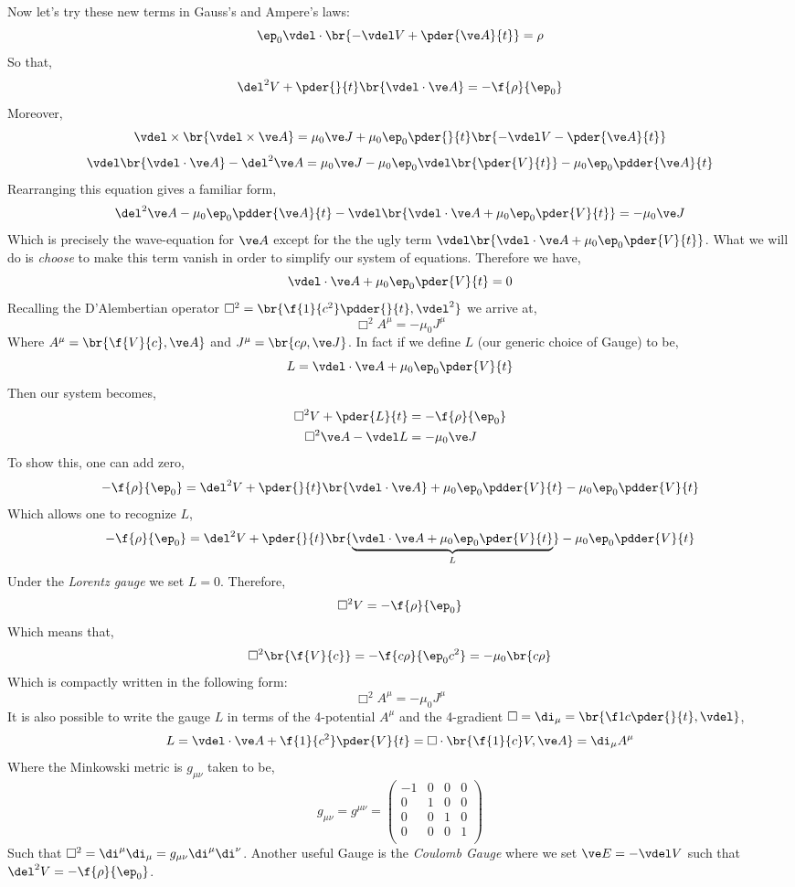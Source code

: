 \documentclass{article}
\begin{document}
Now let's try these new terms in Gauss's and Ampere's laws:
\[ \ep_0\vdel \cdot \br{-\vdel V + \pder{\ve A}{t}} = \rho \]
So that,
\[ \del^2 V + \pder{}{t}\br{\vdel \cdot \ve A} = -\f{\rho}{\ep_0} \]
Moreover,
\[ \vdel \times \br{\vdel \times \ve A} = \mu_0 \ve J + \mu_0 \ep_0 \pder{}{t} \br{-\vdel V - \pder{\ve A}{t}}\]
\[ \vdel \br{\vdel \cdot \ve A} - \del^2 \ve A = \mu_0 \ve J - \mu_0 \ep_0 \vdel \br{\pder{V}{t}} - \mu_0 \ep_0 \pdder{\ve A}{t} \]
Rearranging this equation gives a familiar form,
\[ \del^2 \ve A - \mu_0 \ep_0 \pdder{\ve A}{t} - \vdel \br{\vdel \cdot \ve A + \mu_0 \ep_0 \pder{V}{t}} = - \mu_0 \ve J \]
Which is precisely the wave-equation for $\ve A$ except for the the ugly term $\vdel\br{\vdel \cdot \ve A + \mu_0 \ep_0 \pder{V}{t}}$. What we will do is \textit{choose} to make this term vanish in order to simplify our system of equations. Therefore we have,
\[ \vdel \cdot \ve A + \mu_0 \ep_0 \pder{V}{t} = 0 \]
Recalling the D'Alembertian operator $\Box^2 = \br{\f{1}{c^2} \pdder{}{t}, \vdel^2}$ we arrive at,
\[ \Box^2 A^{\mu} = -\mu_0 J^{\mu} \]
Where $A^{\mu} = \br{\f{V}{c}, \ve A}$ and $J^{\mu} = \br{c \rho, \ve J}$. In fact if we define $L$ (our generic choice of Gauge) to be,
\[ L = \vdel \cdot \ve A + \mu_0 \ep_0 \pder{V}{t} \]
Then our system becomes,
\begin{align*}
    \Box^2 V + \pder{L}{t} &= - \f{\rho}{\ep_0} \\
    \Box^2 \ve A - \vdel L &= - \mu_0 \ve J
\end{align*}
To show this, one can add zero,
\[ -\f{\rho}{\ep_0} = \del^2 V + \pder{}{t}\br{\vdel \cdot \ve A} + \mu_0 \ep_0 \pdder{V}{t} - \mu_0 \ep_0 \pdder{V}{t}\]
Which allows one to recognize $L$,
\[ -\f{\rho}{\ep_0} = \del^2 V + \pder{}{t}\br{\underbrace{\vdel \cdot \ve A + \mu_0 \ep_0 \pder{V}{t}}_{L}} - \mu_0 \ep_0 \pdder{V}{t}\]
Under the \textit{Lorentz gauge} we set $L = 0$. Therefore,
\[ \Box^2 V = - \f{\rho}{\ep_0} \]
Which means that,
\[ \Box^2 \br{\f{V}{c}} = - \f{c\rho}{\ep_0 c^2} = - \mu_0 \br{c \rho} \]
Which is compactly written in the following form:
\[ \Box^2 A^{\mu} = -\mu_0 J^{\mu} \]
It is also possible to write the gauge $L$ in terms of the 4-potential $A^{\mu}$ and the 4-gradient $\Box = \di_\mu = \br{\f1c\pder{}{t}, \vdel}$,
\[ L = \vdel \cdot \ve A + \f{1}{c^2} \pder{V}{t} = \Box \cdot \br{\f{1}{c} V, \ve A}  = \di_{\mu} A^{\mu} \]
Where the Minkowski metric is $g_{\mu\nu}$ taken to be,
\[ g_{\mu\nu} = g^{\mu\nu} = \begin{pmatrix}
    -1 & 0 & 0 & 0 \\
     0 & 1 & 0 & 0 \\
     0 & 0 & 1 & 0 \\
     0 & 0 & 0 & 1 \\
\end{pmatrix} \]
Such that $\Box^2 = \di^{\mu}\di_{\mu} = g_{\mu\nu} \di^{\mu}\di^{\nu}$. Another useful Gauge is the \textit{Coulomb Gauge} where we set $\ve E= - \vdel V$ such that $\del^2 V = - \f{\rho}{\ep_0}$.
\end{document}
